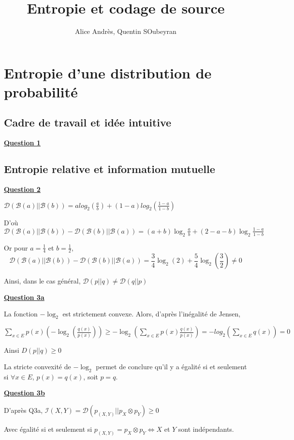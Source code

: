\documentclass[a4paper,twoside,10pt]{article}
\title{Entropie et codage de source}
\author{Alice Andrès, Quentin SOubeyran}
\newcommand{\I}{\mathcal{I}}
\newcommand{\B}{\mathcal{B}}
\newcommand{\D}{\mathcal{D}}
\newenvironment{Q}[1]{%
\vspace{1ex}
\underline{\textbf{Question #1\\}}
\newline
}{
\vspace{2ex}
}
\begin{document}
\maketitle

\section{Entropie d'une distribution de probabilité}

\subsection{Cadre de travail et idée intuitive}
\begin{Q}{1}

\end{Q}
\subsection{Entropie relative et information mutuelle}
\begin{Q}{2}
$\D(\B(a)||\B(b))
= a log_2(\frac{a}{b}) + (1-a) log_2(\frac{1-a}{1-b})$

D'où $\D(\B(a)||\B(b))  - \D(\B(b)||\B(a)) 
= (a+b)\log_2{\frac{a}{b}} + (2-a-b)\log_2{\frac{1-a}{1-b}}$

Or pour $a = \frac{1}{4}$ et $b = \frac{1}{2}$, 
\[
\D(\B(a)||\B(b))  - \D(\B(b)||\B(a))
= \frac{3}{4} \log_2{(2)} + \frac{5}{4} \log_2{(\frac{3}{2})} \neq 0
\]


Ainsi, dans le cas général, $ \D (p||q) \neq \D(q||p)$
\end{Q}

\begin{Q}{3a}
La fonction $- \log_2$ est strictement convexe. Alors, d'après l'inégalité de Jensen, 

$\sum_{x \in E} p(x) (-\log_2{(\frac{q(x)}{p(x)})}) \geq 
-\log_2{(\sum_{x \in E}p(x) \frac{q(x)}{p(x)})} = -log_2{(\sum_{x \in E}q(x))} = 0$

Ainsi $D(p||q) \geq 0$

La stricte convexité de $-\log_2$ permet de conclure qu'il y a égalité si et seulement si $\forall x \in E$, $p(x) = q(x)$, soit $p=q$. 
\end{Q}

\begin{Q}{3b}

D'après Q3a, $\I(X,Y) = \D(p_{(X,Y)} || p_X \otimes p_Y) \geq 0$

Avec égalité si et seulement si $p_{(X,Y)} = p_X \otimes p_Y \iff X$ et $Y$ sont indépendants.
\end{Q}
\end{document}
